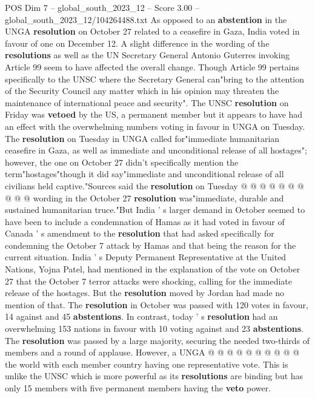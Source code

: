 \begin{textsample}{POS Dim 7 – global\_south\_2023\_12 – Score 3.00 – global\_south\_2023\_12/104264488.txt}  \label{ex:f7_pos_038}
As opposed to an \textbf{abstention} in the UNGA \textbf{resolution} on October 27 related to a ceasefire in Gaza, India voted in favour of one on December 12.
A slight difference in the wording of the \textbf{resolutions} as well as the UN Secretary General Antonio Guterres invoking Article 99 seem to have affected the overall change.
Though Article 99 pertains specifically to the UNSC where the Secretary General can"bring to the attention of the Security Council any matter which in his opinion may threaten the maintenance of international peace and security".
The UNSC \textbf{resolution} on Friday was \textbf{vetoed} by the US, a permanent member but it appears to have had an effect with the overwhelming numbers voting in favour in UNGA on Tuesday.
The \textbf{resolution} on Tuesday in UNGA called for"immediate humanitarian ceasefire in Gaza, as well as immediate and unconditional release of all hostages"; however, the one on October 27 didn't specifically mention the term"hostages"though it did say"immediate and unconditional release of all civilians held captive."Sources said the \textbf{resolution} on Tuesday @ @ @ @ @ @ @ @ @ @ wording in the October 27 \textbf{resolution} was"immediate, durable and sustained humanitarian truce."But India ' s larger demand in October seemed to have been to include a condemnation of Hamas as it had voted in favour of Canada ' s amendment to the \textbf{resolution} that had asked specifically for condemning the October 7 attack by Hamas and that being the reason for the current situation.
India ' s Deputy Permanent Representative at the United Nations, Yojna Patel, had mentioned in the explanation of the vote on October 27 that the October 7 terror attacks were shocking, calling for the immediate release of the hostages.
But the \textbf{resolution} moved by Jordan had made no mention of that.
The \textbf{resolution} in October was passed with 120 votes in favour, 14 against and 45 \textbf{abstentions}.
In contrast, today ' s \textbf{resolution} had an overwhelming 153 nations in favour with 10 voting against and 23 \textbf{abstentions}.
The \textbf{resolution} was passed by a large majority, securing the needed two-thirds of members and a round of applause.
However, a UNGA @ @ @ @ @ @ @ @ @ @ the world with each member country having one representative vote.
This is unlike the UNSC which is more powerful as its \textbf{resolutions} are binding but has only 15 members with five permanent members having the \textbf{veto} power.

\end{textsample}
